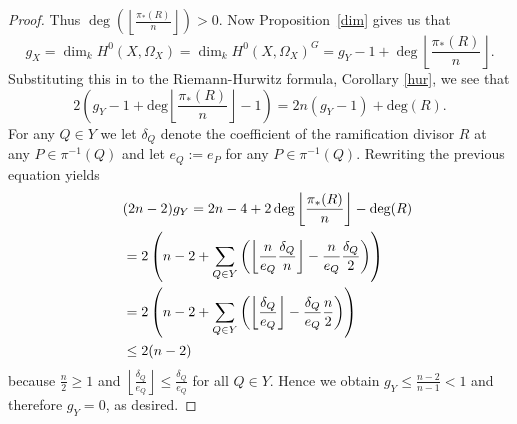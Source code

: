 \begin{proof}
    Thus $\deg\left( \left\lfloor \frac{\pi_*(R)}{n} \right\rfloor \right) >0$. 
    Now Proposition~\ref{dim} gives us that
        \begin{equation*}
        g_X=\dim_k H^0(X,\Omega_X)=\dim_k H^0(X,\Omega_X)^G= g_Y-1+\deg\left\lfloor \frac{\pi_*(R)}{n} \right\rfloor.
        \end{equation*}
    Substituting this in to the Riemann-Hurwitz formula, Corollary \ref{hur}, we see that
        \begin{equation*}
        2\left(g_Y - 1 + \textrm{deg}\left \lfloor \frac{\pi_*(R)}{n} \right \rfloor -1 \right) = 2n (g_Y -1) + \textrm{deg}(R).
        \end{equation*}
    For any $Q \in Y$ we let $\delta_Q$ denote the coefficient of the ramification divisor $R$ at any $P \in \pi^{-1}(Q)$ and let $e_Q := e_P$ for any $P \in \pi^{-1}(Q)$. 
    Rewriting the previous equation yields
        \begin{align*}
        \lefteqn{(2n-2)g_Y = 2n-4 + 2 \,\textrm{deg}\left \lfloor \frac{\pi_*(R)}{n}\right \rfloor - \textrm{deg}(R)}\\
        &= 2 \left(n-2 + \sum_{Q \in Y} \left(\left\lfloor \frac{n}{e_Q} \frac{\delta_Q}{n} \right\rfloor - \frac{n}{e_Q} \frac{\delta_Q}{2}\right) \right)\\
        &= 2 \left(n-2 + \sum_{Q \in Y} \left( \left\lfloor \frac{\delta_Q}{e_Q} \right\rfloor - \frac{\delta_Q}{e_Q} \frac{n}{2} \right)\right)\\
        & \le  2(n-2)
        \end{align*}
    because $\frac{n}{2} \ge 1$ and $\left\lfloor \frac{\delta_Q}{e_Q}\right\rfloor \le \frac{\delta_Q}{e_Q}$ for all $Q \in Y$. 
    Hence we obtain $g_Y \le \frac{n-2}{n-1} < 1$ and therefore $g_Y =0$, as desired.
    

\end{proof}
